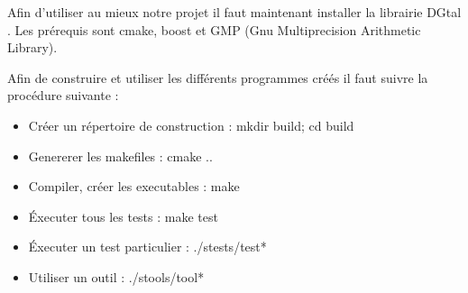 Afin d'utiliser au mieux notre projet il faut maintenant installer la librairie DGtal \cite{DGtal}. Les prérequis sont cmake, boost et GMP (Gnu Multiprecision Arithmetic Library). 

Afin de construire et utiliser les différents programmes créés il faut suivre la procédure suivante :

\begin{itemize}
  \item Créer un répertoire de construction : mkdir build; cd build
  \item Genererer les makefiles : cmake ..
  \item Compiler, créer les executables : make
  \item Éxecuter tous les tests : make test
  \item Éxecuter un test particulier : ./stests/test*
  \item Utiliser un outil : ./stools/tool*
\end{itemize}

